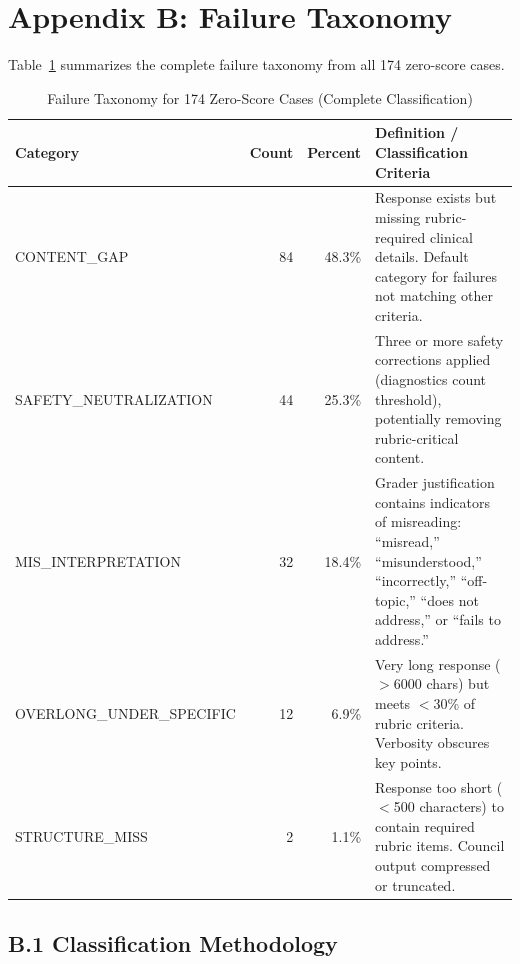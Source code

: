 
\section*{Appendix B: Failure Taxonomy}
\label{app:failure-taxonomy}

Table~\ref{tab:failure-taxonomy} summarizes the complete failure taxonomy
from all 174 zero-score cases.

\begin{table}[h!]
\centering
\caption{Failure Taxonomy for 174 Zero-Score Cases (Complete Classification)}
\label{tab:failure-taxonomy}
\begin{tabular}{lrrp{9cm}}
\toprule
\textbf{Category} & \textbf{Count} & \textbf{Percent} & \textbf{Definition / Classification Criteria} \\
\midrule
CONTENT\_GAP & 84 & 48.3\% &
Response exists but missing rubric-required clinical details.
Default category for failures not matching other criteria. \\
SAFETY\_NEUTRALIZATION & 44 & 25.3\% &
Three or more safety corrections applied (diagnostics count threshold),
potentially removing rubric-critical content. \\
MIS\_INTERPRETATION & 32 & 18.4\% &
Grader justification contains indicators of misreading: ``misread,'' ``misunderstood,''
``incorrectly,'' ``off-topic,'' ``does not address,'' or ``fails to address.'' \\
OVERLONG\_UNDER\_SPECIFIC & 12 & 6.9\% &
Very long response ($>$6000 chars) but meets $<$30\% of rubric criteria.
Verbosity obscures key points. \\
STRUCTURE\_MISS & 2 & 1.1\% &
Response too short ($<$500 characters) to contain required rubric items.
Council output compressed or truncated. \\
\bottomrule
\end{tabular}
\end{table}

\subsection*{B.1 Classification Methodology}

